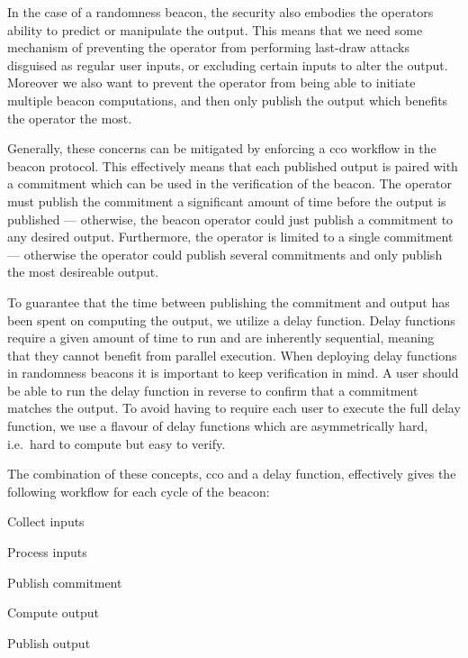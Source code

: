 In the case of a randomness beacon, the security also embodies the operators ability to predict or manipulate the output.
This means that we need some mechanism of preventing the operator from performing last-draw attacks disguised as regular user inputs, or excluding certain inputs to alter the output.
Moreover we also want to prevent the operator from being able to initiate multiple beacon computations, and then only publish the output which benefits the operator the most.

Generally, these concerns can be mitigated by enforcing a \gls{cco} workflow in the beacon protocol.
This effectively means that each published output is paired with a commitment which can be used in the verification of the beacon.
The operator must publish the commitment a significant amount of time before the output is published --- otherwise, the beacon operator could just publish a commitment to any desired output. Furthermore, the operator is limited to a single commitment --- otherwise the operator could publish several commitments and only publish the most desireable output.

To guarantee that the time between publishing the commitment and output has been spent on computing the output, we utilize a delay function.
Delay functions require a given amount of time to run and are inherently sequential, meaning that they cannot benefit from parallel execution.
When deploying delay functions in randomness beacons it is important to keep verification in mind.
A user should be able to run the delay function in reverse to confirm that a commitment matches the output.
To avoid having to require each user to execute the full delay function, we use a flavour of delay functions which are asymmetrically hard, i.e.\ hard to compute but easy to verify.

The combination of these concepts, \gls{cco} and a delay function, effectively gives the following workflow for each cycle of the beacon:

\begin{enumberate}
    \item Collect inputs
    \item Process inputs
    \item Publish commitment
    \item Compute output
    \item Publish output
\end{enumberate}


